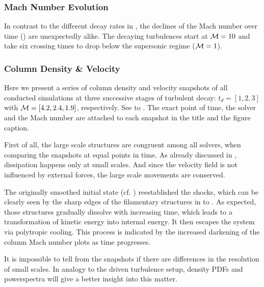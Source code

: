 \subsubsection{Mach Number Evolution}
In contrast to the different decay rates in
, the declines of the Mach number
over time () are unexpectedly alike.  The
decaying turbulences start at $\mathcal{M} = 10$ and take six crossing times to drop
below the supersonic regime ($\mathcal{M} = 1$). 

\subsubsection{Column Density \& Velocity}
\label{sec:decayturb-column-plots}
Here we present a series of column density and velocity snapshots of all
conducted simulations at three successive stages of turbulent decay: $t_d =
[1,2,3]$ with $\mathcal{M} = [4.2,2.4,1.9]$, respectively. See
 to .
The exact point of time, the solver and the Mach number are attached to each
snapshot in the title and the figure caption.

First of all, the large scale structures are congruent among all solvers,
when comparing the snapshots at equal points in time. As already discussed
in , dissipation happens only at small scales.
And since the velocity field is not influenced by external forces, the large
scale movements are conserved.

The originally smoothed initial state (cf.
) reestablished the shocks,
which can be clearly seen by the sharp edges of the filamentary structures in
 to .
As expected, those structures gradually dissolve with increasing time, which
leads to a transformation of kinetic energy into internal energy. It then
escapes the system via polytropic cooling. This process is indicated by
the increased darkening of the column Mach number plots as time progresses.

It is impossible to tell from the snapshots if there are differences in
the resolution of small scales. In analogy to the driven turbulence setup,
density PDFs and powerspectra will give a better insight into this matter.

